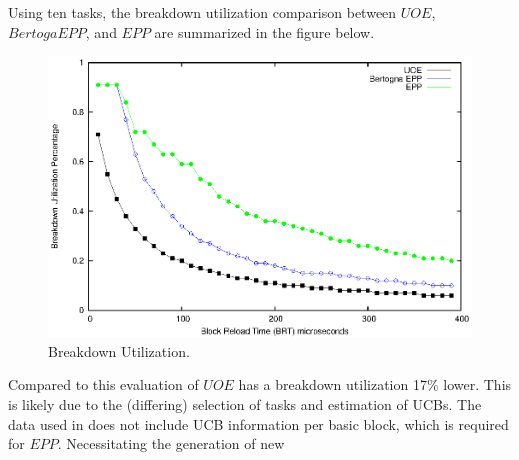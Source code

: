 Using ten tasks, the breakdown utilization comparison between ${UOE}$,
${Bertoga EPP}$, and ${EPP}$ are summarized in the figure below.
\begin{figure}[h!]
\vspace{-10pt}
\begin{center}
\includegraphics[width=\linewidth]{eps/breakdown.eps}
\caption{Breakdown Utilization.}
\label{fig:breakdown_utilization}
\end{center}
\vspace{-10pt}
\end{figure}
Compared to \cite{lunniss:13} this evaluation of ${UOE}$ has a
breakdown utilization 17\% lower. This is likely due to the
(differing) selection of tasks and estimation of UCBs. The data used
in \cite{lunniss:13} does not include UCB information per basic block,
which is required for ${EPP}$. Necessitating the generation of new
